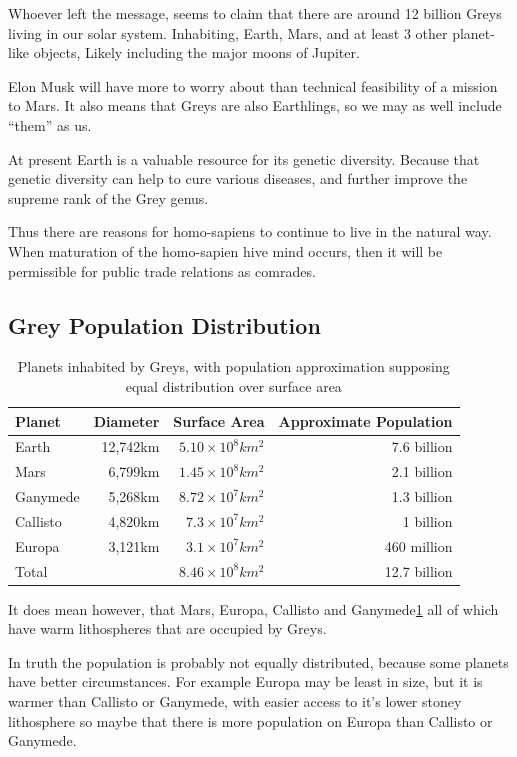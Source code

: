\documentclass{report}
\begin{document}
Whoever left the message, seems to claim that there are around 12 billion
Greys living in our solar system. Inhabiting, Earth, Mars, and at least 3 other
planet-like objects, Likely including the major moons of Jupiter. 

Elon Musk will have more to worry about than technical feasibility of a mission
to Mars. It also means that Greys are also Earthlings, so we may as well include
``them'' as us. 


At present Earth is a valuable resource for its genetic diversity. Because that
genetic diversity can help to cure various diseases, and further improve the
supreme rank of the Grey genus. 

Thus there are reasons for homo-sapiens to continue to live in the natural way.
When maturation of the homo-sapien hive mind occurs, then it will be
permissible for public trade relations as comrades.

\subsection{Grey Population Distribution}
\label{popdist}
\begin{table}
\begin{tabular}{lrrr}
  Planet & Diameter & Surface Area & Approximate Population\\
\midrule
  Earth & 12,742km & $5.10\times10^8km^2$& 7.6 billion\\
  Mars & 6,799km & $1.45\times10^8km^2$& 2.1 billion \\
  Ganymede & 5,268km & $8.72\times10^7km^2$ & 1.3 billion \\
  Callisto & 4,820km & $7.3\times10^7km^2$ & 1 billion\\
  Europa & 3,121km & $3.1\times10^7km^2$& 460 million\\
\midrule
  Total &   & $8.46\times10^8km^2$ & 12.7 billion\\
\end{tabular}
\caption{Planets inhabited by Greys, with population approximation supposing
equal distribution over surface area}
\label{table:planets}
\end{table}

It does mean however, that Mars, Europa, Callisto and 
Ganymede\ref{table:planets} all of which
have warm lithospheres that are occupied by Greys. 

In truth the population is probably not equally distributed, because some
planets have better circumstances. For example Europa may be least in size, but
it is warmer than Callisto or Ganymede, with easier access to it's lower stoney
lithosphere so maybe that there is more population on Europa than Callisto or
Ganymede. 
\end{document}
